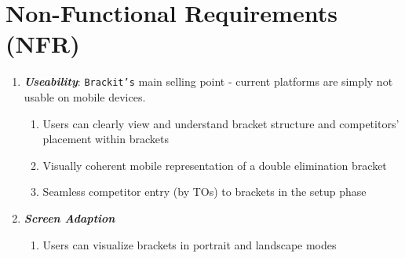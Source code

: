 \documentclass{article}
\begin{document}
\section*{Non-Functional Requirements (NFR)}
\begin{enumerate}
\item \textbf{\textit{Useability}}: \texttt{Brackit's} main selling point - current platforms are simply not usable on mobile devices. 
    \begin{enumerate}[label*=\arabic*.]
    \item{Users can clearly view and understand bracket structure and competitors’ placement within brackets}
    \item{Visually coherent mobile representation of a double elimination bracket}
    \item{Seamless competitor entry (by TOs) to brackets in the setup phase}
    \end{enumerate}

\item \textbf{\textit{Screen Adaption}}
    \begin{enumerate}[label*=\arabic*.]
    \item{Users can visualize brackets in portrait and landscape modes}
    \end{enumerate}





\end{enumerate}
\end{document}
